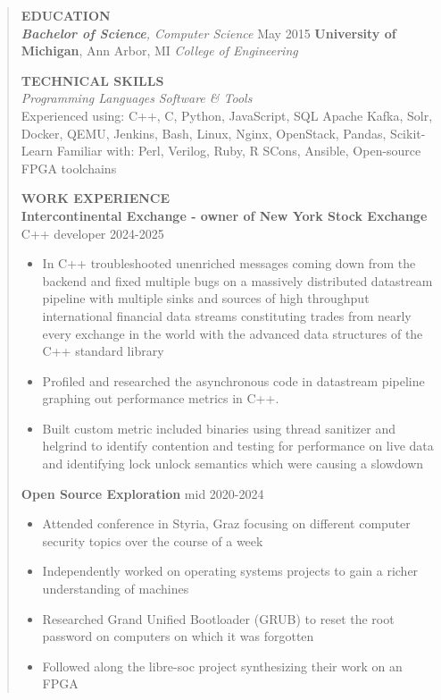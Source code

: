 \documentclass[11pt,a4paper]{article}
\begin{document}
\begin{quote}
\textbf{EDUCATION}\\
\emph{\textbf{Bachelor of Science}, Computer Science} May 2015
\textbf{University of Michigan}, Ann Arbor, MI \emph{College of
Engineering}

\textbf{TECHNICAL SKILLS}\\
\emph{Programming Languages} \emph{Software \& Tools}\\
Experienced using: C++, C, Python, JavaScript, SQL Apache Kafka, Solr,
Docker, QEMU, Jenkins, Bash, Linux, Nginx, OpenStack, Pandas,
Scikit-Learn Familiar with: Perl, Verilog, Ruby, R SCons, Ansible,
Open-source FPGA toolchains

\textbf{WORK EXPERIENCE}\\

\textbf{Intercontinental Exchange - owner of New York Stock Exchange} C++ developer 2024-2025
\begin{itemize}
\item In C++ troubleshooted unenriched messages coming down from the backend and fixed multiple bugs on a massively distributed datastream pipeline with multiple sinks and sources of high throughput international financial data streams constituting trades from nearly every exchange in the world with the advanced data structures of the C++ standard library 
\item Profiled and researched the asynchronous code in datastream pipeline graphing out performance metrics in C++.
\item Built custom metric included binaries using thread sanitizer and helgrind to identify contention and testing for performance on live data and identifying lock unlock semantics which were causing a slowdown
\end{itemize}

\textbf{Open Source Exploration} mid 2020-2024
\begin{itemize}
\item Attended conference in
Styria, Graz focusing on different computer security topics over the
course of a week
\item Independently worked on operating systems projects to
gain a richer understanding of machines
\item Researched Grand Unified Bootloader (GRUB) to reset the root password on
computers on which it was forgotten
\item Followed along the libre-soc project synthesizing their work on an FPGA
\end{itemize}


\end{quote}
\end{document}
